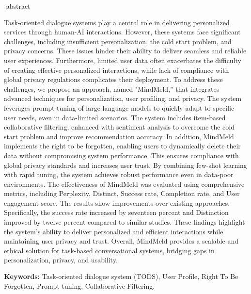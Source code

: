 \en-abstract{
\begin{flushleft}
\begin{LTR}

Task-oriented dialogue systems play a central role in delivering personalized services through human-AI interactions. However, these systems face significant challenges, including insufficient personalization, the cold start problem, and privacy concerns. These issues hinder their ability to deliver seamless and reliable user experiences. Furthermore, limited user data often exacerbates the difficulty of creating effective personalized interactions, while lack of compliance with global privacy regulations complicates their deployment. To address these challenges, we propose an approach, named "MindMeld,” that integrates advanced techniques for personalization, user profiling, and privacy. The system leverages prompt-tuning of large language models to quickly adapt to specific user needs, even in data-limited scenarios. The system includes item-based collaborative filtering, enhanced with sentiment analysis to overcome the cold start problem and improve recommendation accuracy. In addition, MindMeld implements the right to be forgotten, enabling users to dynamically delete their data without compromising system performance. This ensures compliance with global privacy standards and increases user trust. By combining few-shot learning with rapid tuning, the system achieves robust performance even in data-poor environments. The effectiveness of MindMeld was evaluated using comprehensive metrics, including Perplexity, Distinct, Success rate, Completion rate, and User engagement score. The results show improvements over existing approaches. Specifically, the success rate increased by seventeen percent and Distinction improved by twelve percent compared to similar studies. These findings highlight the system’s ability to deliver personalized and efficient interactions while maintaining user privacy and trust. Overall, MindMeld provides a scalable and ethical solution for task-based conversational systems, bridging gaps in personalization, privacy, and usability.

\vspace{1cm}
\textbf{Keywords:}  Task-oriented dialogue system (TODS), User Profile, Right To Be Forgotten, Prompt-tuning, Collaborative Filtering.


\end{LTR}
\end{flushleft}
}





